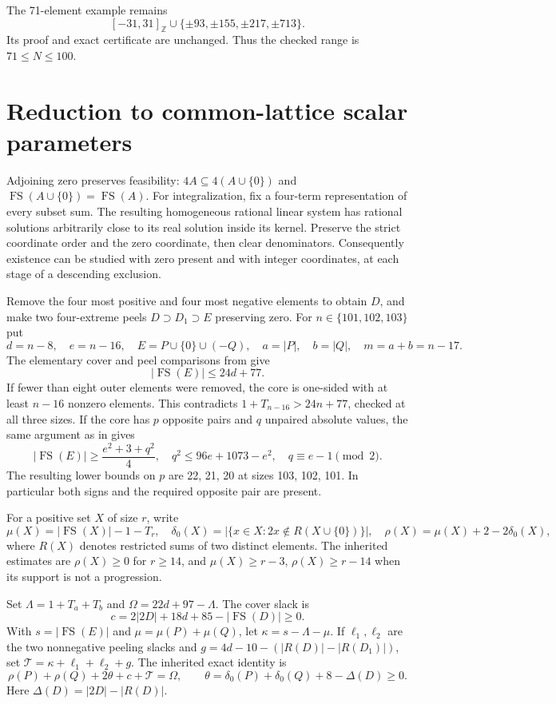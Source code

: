 \documentclass[11pt,a4paper]{article}
\newcommand{\FS}{\operatorname{FS}}
\newcommand{\Z}{\mathbb Z}
\newcommand{\T}{\mathcal T}
\begin{document}
The 71-element example remains
\[
 [-31,31]_{\Z}\cup\{\pm93,\pm155,\pm217,\pm713\}.
\]
Its proof and exact certificate are unchanged. Thus the checked range is
$71\le N\le100$.

\section{Reduction to common-lattice scalar parameters}
Adjoining zero preserves feasibility: $4A\subseteq4(A\cup\{0\})$
and $\FS(A\cup\{0\})=\FS(A)$.
For integralization, fix a four-term representation of every subset sum.
The resulting homogeneous rational linear system has rational solutions
arbitrarily close to its real solution inside its kernel. Preserve the
strict coordinate order and the zero coordinate, then clear denominators.
Consequently existence can be studied with zero present and with integer
coordinates, at each stage of a descending exclusion.

Remove the four most positive and four most negative elements to obtain
$D$, and make two four-extreme peels $D\supset D_1\supset E$ preserving
zero. For $n\in\{101,102,103\}$ put
\[
 d=n-8,\quad e=n-16,\quad E=P\cup\{0\}\cup(-Q),\quad
 a=|P|,\quad b=|Q|,\quad m=a+b=n-17.
\]
The elementary cover and peel comparisons from \cite{previous} give
\[
 |\FS(E)|\le24d+77.
\]
If fewer than eight outer elements were removed, the core is one-sided
with at least $n-16$ nonzero elements. This contradicts
$1+T_{n-16}>24n+77$, checked at all three sizes.
If the core has $p$ opposite pairs and $q$ unpaired absolute values, the
same argument as in \cite{previous} gives
\[
 |\FS(E)|\ge\frac{e^2+3+q^2}{4},\quad
 q^2\le96e+1073-e^2,\quad q\equiv e-1\pmod2.
\]
The resulting lower bounds on $p$ are 22, 21, 20 at sizes 103, 102, 101.
In particular both signs and the required opposite pair are present.

For a positive set $X$ of size $r$, write
\[
 \mu(X)=|\FS(X)|-1-T_r,\quad
 \delta_0(X)=|\{x\in X:2x\notin R(X\cup\{0\})\}|,\quad
 \rho(X)=\mu(X)+2-2\delta_0(X),
\]
where $R(X)$ denotes restricted sums of two distinct elements. The
inherited estimates are $\rho(X)\ge0$ for $r\ge14$, and
$\mu(X)\ge r-3$, $\rho(X)\ge r-14$ when its support is not a progression.

Set $\Lambda=1+T_a+T_b$ and $\Omega=22d+97-\Lambda$.
The cover slack is
\[
 c=2|2D|+18d+85-|\FS(D)|\ge0.
\]
With $s=|\FS(E)|$ and $\mu=\mu(P)+\mu(Q)$, let
$\kappa=s-\Lambda-\mu$. If $\ell_1,\ell_2$ are the two nonnegative
peeling slacks and
$g=4d-10-(|R(D)|-|R(D_1)|)$, set
$\T=\kappa+\ell_1+\ell_2+g$. The inherited exact identity is
\begin{equation}\label{eq:budget}
 \rho(P)+\rho(Q)+2\theta+c+\T=\Omega,
 \qquad \theta=\delta_0(P)+\delta_0(Q)+8-\Delta(D)\ge0.
\end{equation}
Here $\Delta(D)=|2D|-|R(D)|$.
\end{document}
